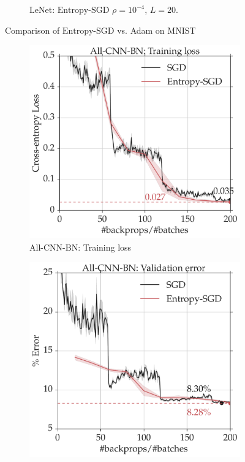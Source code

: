 \documentclass[10pt]{article}
\newcommand{\entropysgd}{\mathrm{Entropy}\textrm{-}\mathrm{SGD}}
\newcommand{\lenet}{\textrm{LeNet}}
\newcommand{\allcnn}{\textrm{All-CNN-BN}}
\begin{document}
\begin{figure}[h!]
\begin{subfigure}[t]{0.45\textwidth}
        \caption{\small $\lenet$: $\entropysgd$ $\rho = 10^{-4}$, $L = 20$.}
        \label{fig:lenet_test}
    \end{subfigure}
\caption{\small Comparison of $\entropysgd$ vs. Adam on MNIST\vspace*{0.15in}}
\label{fig:mnist_test}
\end{figure}

\begin{figure}[htp!]
\centering
    \begin{subfigure}[b]{0.45\textwidth}
        \centering
        \includegraphics[width=1.03\textwidth]{allcnn_loss.pdf}
        \caption{\small $\allcnn$: Training loss}
        \label{fig:allcnn_loss}
    \end{subfigure}
    \hspace{0.1in}
    \begin{subfigure}[b]{0.45\textwidth}
        \centering
        \includegraphics[width=\textwidth]{allcnn_valid.pdf}

\end{subfigure}
\end{figure}
\end{document}
